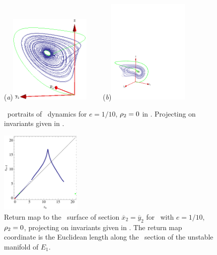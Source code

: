 \begin{figure}[ht]
\begin{center}
  (\textit{a})\includegraphics[width=0.35\textwidth]{../figs/CLEinvXYZ}
~~~~(\textit{b})\includegraphics[width=0.35\textwidth]{../figs/CLEinvYYZ}
\end{center}
\caption{
\Statesp\ portraits of \CLe\ dynamics for $e=1/10$,
$\rho_2=0$ in \reducedsp. Projecting on invariants given in
.
    }
\label{fig:CLEinv}
\end{figure}

\begin{figure}[ht]
\begin{center}
\includegraphics[width=0.35\textwidth]{../figs/CLEinvRM}
\end{center}
\caption[Return map for Complex Lorenz flow]{
Return map to the \Poincare\ surface of section
$\overline{x}_2=\overline{y}_2$ for \CLe\ with $e=1/10$,
$\rho_2=0$, projecting on invariants given in
. The return map coordinate is the
Euclidean length along the \Poincare\ section of the unstable
manifold of $E_1$.
    }
\label{fig:CLEinvRM}
\end{figure}
